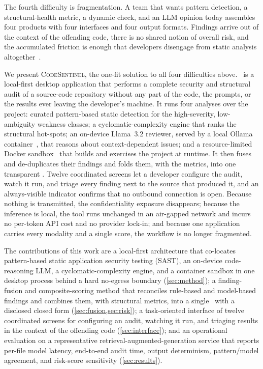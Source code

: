 The fourth difficulty is fragmentation. A team that wants pattern
detection, a structural-health metric, a dynamic check, and an LLM
opinion today assembles four products with four interfaces and four
output formats. Findings arrive out of the context of the offending code,
there is no shared notion of overall risk, and the accumulated friction
is enough that developers disengage from static analysis
altogether~\cite{johnson2013,nachtigall2022}.

We present \textsc{CodeSentinel}\repomark, the one-fit solution to all
four difficulties above. \cs\ is a local-first desktop application that
performs a complete security and structural audit of a source-code
repository without any part of the code, the prompts, or the results
ever leaving the developer's machine. It runs four analyses over the
project: curated pattern-based static detection for the high-severity,
low-ambiguity weakness classes; a cyclomatic-complexity engine that
ranks the structural hot-spots; an on-device \mbox{Llama~3.2} reviewer,
served by a local Ollama container~\cite{ollama,touvron2023llama2}, that
reasons about context-dependent issues; and a resource-limited Docker
sandbox~\cite{merkel2014docker} that builds and exercises the project at
runtime. It then fuses and de-duplicates their findings and folds them,
with the metrics, into one transparent \phindex. Twelve coordinated
screens let a developer configure the audit, watch it run, and triage
every finding next to the source that produced it, and an always-visible
indicator confirms that no outbound connection is open. Because nothing
is transmitted, the confidentiality exposure disappears; because the
inference is local, the tool runs unchanged in an air-gapped network and
incurs no per-token API cost and no provider lock-in; and because one
application carries every modality and a single score, the workflow is no
longer fragmented.

The contributions of this work are a local-first architecture that
co-locates pattern-based static application security testing (SAST), an
on-device code-reasoning LLM, a cyclomatic-complexity engine, and a
container sandbox in one desktop process behind a hard no-egress boundary
(\cref{sec:method}); a finding-fusion and composite-scoring method that
reconciles rule-based and model-based findings and combines them, with
structural metrics, into a single \phindex\ with a disclosed closed form
(\cref{sec:fusion,sec:risk}); a task-oriented interface of twelve
coordinated screens for configuring an audit, watching it run, and
triaging results in the context of the offending code
(\cref{sec:interface}); and an operational evaluation on a representative
retrieval-augmented-generation service that reports per-file model
latency, end-to-end audit time, output determinism, pattern/model
agreement, and risk-score sensitivity (\cref{sec:results}).

